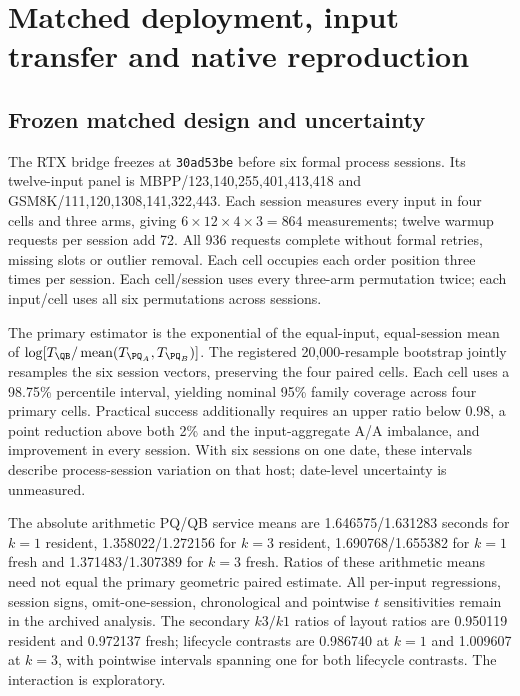 \section{Matched deployment, input transfer and native reproduction}
\label{supp:followup}
\subsection{Frozen matched design and uncertainty}
The RTX bridge freezes at \texttt{30ad53be} before six formal process sessions. Its twelve-input panel is MBPP/123,140,255,401,413,418 and GSM8K/111,120,1308,141,322,443. Each session measures every input in four cells and three arms, giving $6\times12\times4\times3=864$ measurements; twelve warmup requests per session add 72. All 936 requests complete without formal retries, missing slots or outlier removal. Each cell occupies each order position three times per session. Each cell/session uses every three-arm permutation twice; each input/cell uses all six permutations across sessions.

The primary estimator is the exponential of the equal-input, equal-session mean of $\log[T_{\QB}/\operatorname{mean}(T_{\PQ_A},T_{\PQ_B})]$. The registered 20,000-resample bootstrap jointly resamples the six session vectors, preserving the four paired cells. Each cell uses a 98.75\% percentile interval, yielding nominal 95\% family coverage across four primary cells. Practical success additionally requires an upper ratio below 0.98, a point reduction above both 2\% and the input-aggregate A/A imbalance, and improvement in every session. With six sessions on one date, these intervals describe process-session variation on that host; date-level uncertainty is unmeasured.

The absolute arithmetic PQ/QB service means are 1.646575/1.631283 seconds for $k=1$ resident, 1.358022/1.272156 for $k=3$ resident, 1.690768/1.655382 for $k=1$ fresh and 1.371483/1.307389 for $k=3$ fresh. Ratios of these arithmetic means need not equal the primary geometric paired estimate. All per-input regressions, session signs, omit-one-session, chronological and pointwise $t$ sensitivities remain in the archived analysis. The secondary $k3/k1$ ratios of layout ratios are 0.950119 resident and 0.972137 fresh; lifecycle contrasts are 0.986740 at $k=1$ and 1.009607 at $k=3$, with pointwise intervals spanning one for both lifecycle contrasts. The interaction is exploratory.

